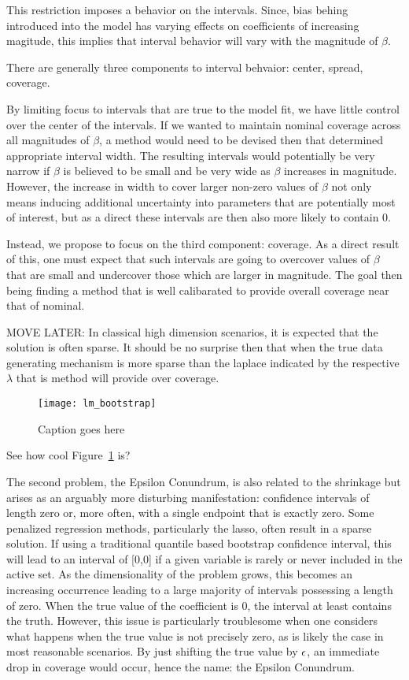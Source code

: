 This restriction imposes a behavior on the intervals. Since, bias behing introduced into the model has varying effects on coefficients of increasing magitude, this implies that interval behavior will vary with the magnitude of $\beta$.

There are generally three components to interval behvaior: center, spread, coverage.

By limiting focus to intervals that are true to the model fit, we have little control over the center of the intervals. If we wanted to maintain nominal coverage across all magnitudes of $\beta$, a method would need to be devised then that determined appropriate interval width. The resulting intervals would potentially be very narrow if $\beta$ is believed to be small and be very wide as $\beta$ increases in magnitude. However, the increase in width to cover larger non-zero values of $\beta$ not only means inducing additional uncertainty into parameters that are potentially most of interest, but as a direct these intervals are then also more likely to contain 0.

Instead, we propose to focus on the third component: coverage. As a direct result of this, one must expect that such intervals are going to overcover values of $\beta$ that are small and undercover those which are larger in magnitude. The goal then being finding a method that is well calibarated to provide overall coverage near that of nominal.

MOVE LATER: In classical high dimension scenarios, it is expected that the solution is often sparse. It should be no surprise then that when the true data generating mechanism is more sparse than the laplace indicated by the respective $\lambda$ that is method will provide over coverage.

\begin{figure}
  \texttt{[image: lm\_bootstrap]}
  \caption{\label{Fig:lm_bootstrap} Caption goes here}
\end{figure}

See how cool Figure~\ref{Fig:lm_bootstrap} is?

The second problem, the Epsilon Conundrum, is also related to the shrinkage but arises as an arguably more disturbing manifestation: confidence intervals of length zero or, more often, with a single endpoint that is exactly zero. Some penalized regression methods, particularly the lasso, often result in a sparse solution. If using a traditional quantile based bootstrap confidence interval, this will lead to an interval of [0,0] if a given variable is rarely or never included in the active set. As the dimensionality of the problem grows, this becomes an increasing occurrence leading to a large majority of intervals possessing a length of zero. When the true value of the coefficient is 0, the interval at least contains the truth. However, this issue is particularly troublesome when one considers what happens when the true value is not precisely zero, as is likely the case in most reasonable scenarios. By just shifting the true value by $\epsilon$, an immediate drop in coverage would occur, hence the name: the Epsilon Conundrum.

